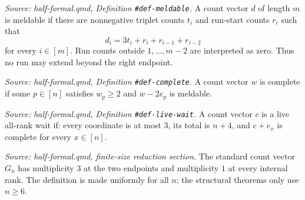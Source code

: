\begin{definition}\leanok
[Meldability]
  \label{def:meldable}
  \textit{Source: half-formal.qmd, Definition \texttt{\#def-meldable}.}
  A count vector \(d\) of length \(m\) is meldable if there are
  nonnegative triplet counts \(t_i\) and run-start counts \(r_i\) such that
  \[
    d_i=3t_i+r_i+r_{i-1}+r_{i-2}
  \]
  for every \(i\in[m]\).  Run counts outside \(1,\ldots,m-2\) are
  interpreted as zero.  Thus no run may extend beyond the right endpoint.
\end{definition}

\begin{definition}
  \label{def:complete}
  \textit{Source: half-formal.qmd, Definition \texttt{\#def-complete}.}
  A count vector \(w\) is complete if some \(p\in[n]\) satisfies
  \(w_p\geq2\) and \(w-2e_p\) is meldable.
\end{definition}

\begin{definition}
  \label{def:live_wait}
  \textit{Source: half-formal.qmd, Definition \texttt{\#def-live-wait}.}
  A count vector \(c\) is a live all-rank wait if:
  every coordinate is at most \(3\), its total is \(n+4\), and
  \(c+e_x\) is complete for every \(x\in[n]\).
\end{definition}

\begin{definition}
  \label{def:standard}
  \textit{Source: half-formal.qmd, finite-size reduction section.}
  The standard count vector \(G_n\) has multiplicity \(3\) at the two
  endpoints and multiplicity \(1\) at every internal rank.  The definition
  is made uniformly for all \(n\); the structural theorems only use
  \(n\geq6\).
\end{definition}

